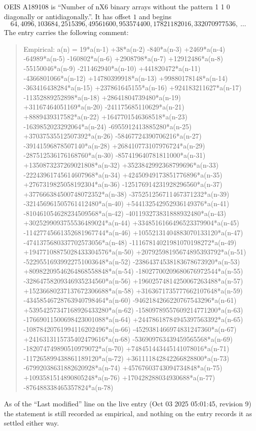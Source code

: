 \documentclass[11pt,a4paper]{article}
\theoremstyle{plain}
\theoremstyle{definition}
\begin{document}
OEIS A189108 is ``Number of nX6 binary arrays without the pattern 1 1 0 diagonally or antidiagonally.''. It has offset $1$ and begins
\[
64, 4096, 103684, 2515396, 49561600, 953574400, 17821182016, 332070977536,\ \dots
\]
The entry carries the following comment:
\begin{quote}\small
Empirical: a(n) = 19*a(n-1) +38*a(n-2) -840*a(n-3) +2469*a(n-4) -64989*a(n-5) -160802*a(n-6) +2908798*a(n-7) +12912486*a(n-8) -55150046*a(n-9) -211462940*a(n-10) +441820472*a(n-11) -4366801066*a(n-12) +14780399918*a(n-13) +99880178148*a(n-14) -363416438284*a(n-15) +237861645155*a(n-16) +924183211627*a(n-17) -11352889252898*a(n-18) +28641804739480*a(n-19) +31167464051169*a(n-20) -241175685110629*a(n-21) +8889439317582*a(n-22) +1647701546368518*a(n-23) -1639852023292064*a(n-24) -6955912413885280*a(n-25) +37037535512507392*a(n-26) -58467724390706216*a(n-27) -39141596878507140*a(n-28) +268410773107976724*a(n-29) -287512536176168760*a(n-30) -857419640781811000*a(n-31) +1350873237269021808*a(n-32) +3523842992368799696*a(n-33) -22243961745614607968*a(n-34) +42450949173851776896*a(n-35) +2767319825058192304*a(n-36) -125176914231928296560*a(n-37) +377666384500748072352*a(n-38) -375251256711467371232*a(n-39) -321456961505761412480*a(n-40) +544132542952936149376*a(n-41) -810461054628234509568*a(n-42) -401193273831888932480*a(n-43) +3025299093755536489024*a(n-44) +3348516166496523379904*a(n-45) -11427745661352681967744*a(n-46) +10552131404883070133120*a(n-47) -4741375680337702573056*a(n-48) -11167814021981070198272*a(n-49) +19477108875028433304576*a(n-50) +20792598195674895393792*a(n-51) -52295516939922751003648*a(n-52) -23864374538183678673920*a(n-53) +80982209546264868558848*a(n-54) -18027700209680676972544*a(n-55) -32864758209346935234560*a(n-56) +19602574814250067263488*a(n-57) +15236680237137672306688*a(n-58) +3163671735777662107648*a(n-59) -43458546728763940798464*a(n-60) -9462184266220767543296*a(n-61) +53954257347168926433280*a(n-62) -15809789557609214771200*a(n-63) -17669011500698423001088*a(n-64) +24478618784945397563392*a(n-65) -10878420761994116202496*a(n-66) -4529381466974831247360*a(n-67) +2416313115735402479616*a(n-68) -536909763439459565568*a(n-69) -182074749890510979072*a(n-70) +748451443445141078016*a(n-71) -117265899438861189120*a(n-72) +361111842842266828800*a(n-73) -67992038631882620928*a(n-74) +45767603743094734848*a(n-75) +1093581514890805248*a(n-76) +170428288034930688*a(n-77) -876488338465357824*a(n-78)
\end{quote}
As of the ``Last modified'' line on the live entry (Oct 03 2025 05:01:45, revision 9) the statement is
still recorded as empirical, and nothing on the entry records it as settled either way.
\end{document}
